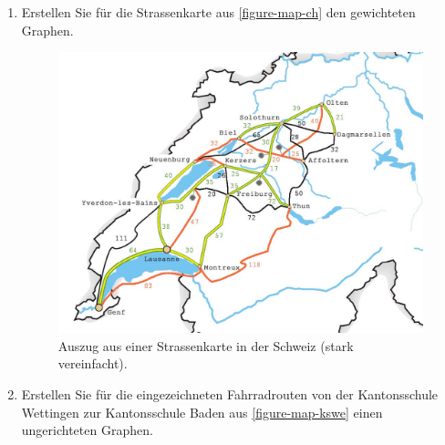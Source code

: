 \begin{enumerate}
\item Erstellen Sie für die Strassenkarte aus \autoref{figure-map-ch} den gewichteten Graphen.

\begin{figure}[htb]
\centering
\includegraphics[scale=0.75]{map_ch}
\caption{Auszug aus einer Strassenkarte in der Schweiz (stark vereinfacht).}
\label{figure-map-ch}
\end{figure}


\newpage

\item Erstellen Sie für die eingezeichneten Fahrradrouten von der Kantonsschule Wettingen zur Kantonsschule Baden aus \autoref{figure-map-kswe} einen ungerichteten Graphen.


\end{enumerate}
